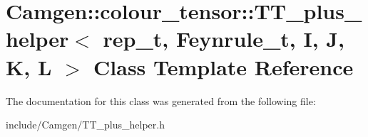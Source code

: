 \hypertarget{a00541}{\section{Camgen\-:\-:colour\-\_\-tensor\-:\-:T\-T\-\_\-plus\-\_\-helper$<$ rep\-\_\-t, Feynrule\-\_\-t, I, J, K, L $>$ Class Template Reference}
\label{a00541}
}


The documentation for this class was generated from the following file\-:\begin{DoxyCompactItemize}
\item 
include/\-Camgen/T\-T\-\_\-plus\-\_\-helper.\-h\end{DoxyCompactItemize}
